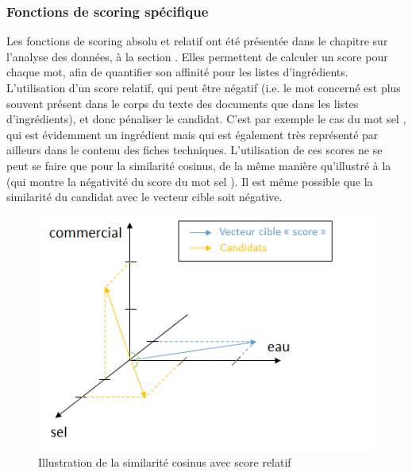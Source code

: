             \subsubsection{Fonctions de scoring spécifique}

            Les fonctions de scoring \og absolu \fg et \og relatif \fg ont été présentée dans le chapitre sur l'analyse des données, à la section .
            Elles permettent de calculer un score pour chaque mot, afin de quantifier son \og affinité \fg pour les listes d'ingrédients.
            L'utilisation d'un score relatif, qui peut être négatif (i.e. le mot concerné est plus souvent présent dans le corps du texte des documents que dans les listes d'ingrédients), et donc pénaliser le candidat. 
            C'est par exemple le cas du mot \og sel \fg, qui est évidemment un ingrédient mais qui est également très représenté par ailleurs dans le contenu des fiches techniques.
            L'utilisation de ces scores ne se peut se faire que pour la similarité cosinus, de la même manière qu'illustré à la  (qui montre la \og négativité \fg du score du mot \og sel \fg).
            Il est même possible que la similarité du candidat avec le vecteur cible soit négative.

            \begin{figure}[htbp]
                \begin{center}
                \includegraphics[width=0.6\linewidth]{img/similarite_score.png}
                \end{center}
                \caption{Illustration de la similarité cosinus avec score relatif}
                \label{fig:similarite_score}
            \end{figure}


